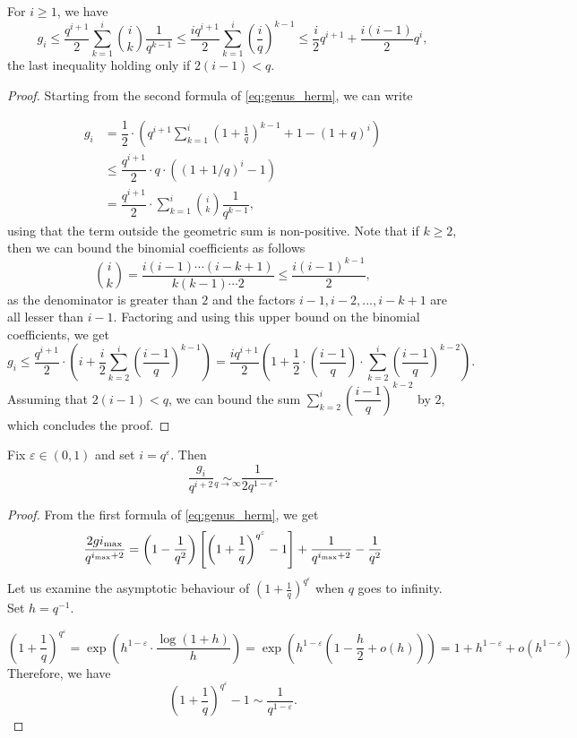 \documentclass[10pt,a4paper]{article}
\renewcommand\epsilon{\varepsilon}
\newcommand{\cd}{\cdot}
\newcommand{\ii}{i_{\rm{max}}}
\theoremstyle{plain}
\theoremstyle{plain}
\theoremstyle{definition}
\theoremstyle{remark}
\theoremstyle{plain}
\begin{document}
\begin{proposition}\label{prop:maj_genus_herm}
	For $i \geq 1$, we have
	\[g_i \leq \dfrac{q^{i+1}}{2} \sum\limits_{k=1}^i \binom{i}{k} \dfrac{1}{q^{k-1}} \leq \dfrac{iq^{i+1}}{2} \sum\limits_{k=1}^i \left(\dfrac{i}{q}\right)^{k-1} \leq \dfrac{i}{2}q^{i+1} + \dfrac{i(i-1)}{2}q^i,\]
	the last inequality holding only if $2(i-1) < q$.
\end{proposition}

\begin{proof}
	Starting from the second formula of \eqref{eq:genus_herm}, we can write
	
	\begin{align*} g_i  &= \dfrac{1}{2} \cd \left(q^{i+1}\sum\limits_{k=1}^i \left(1+\frac{1}{q}\right)^{k-1} +1 -(1+q)^i\right)\\ 
    &\leq \dfrac{q^{i+1}}{2} \cd q \cd ((1+1/q)^i-1) \\ &= \dfrac{q^{i+1}}{2} \cd \sum\limits_{k=1}^i \binom{i}{k} \dfrac{1}{q^{k-1}},
    \end{align*}
	using that the term outside the geometric sum is non-positive. Note that if $k \geq 2$, then we can bound the binomial coefficients as follows
	\[\binom{i}{k} = \dfrac{i(i-1) \cdots (i-k+1)}{k(k-1) \cdots 2} \leq \dfrac{i(i-1)^{k-1}}{2},\] 
	as the denominator is greater than $2$ and the factors $i-1,i-2,...,i-k+1$ are all lesser than $i-1$. Factoring and using this upper bound on the binomial coefficients, we get
	\[  g_i \leq \dfrac{q^{i+1}}{2} \cd \left( i + \frac{i}{2} \sum\limits_{k=2}^i \left(\dfrac{i-1}{q}\right)^{k-1}\right) = \dfrac{iq^{i+1}}{2} \left( 1 + \frac{1}{2} \cd \left(\frac{i-1}{q}\right) \cd \sum\limits_{k=2}^i \left(\dfrac{i-1}{q}\right)^{k-2}\right).\]
	Assuming that $2(i-1) < q$, we can bound the sum  $\sum\limits_{k=2}^i \left(\dfrac{i-1}{q}\right)^{k-2}$ by $2$, which concludes the proof.
\end{proof}

\begin{lemma}\label{lem:gen_sympt}
	Fix $\epsilon \in (0,1)$ and set $i = q^{\epsilon}$. Then
	\[\frac{g_i}{q^{i+2}} \underset{q \rightarrow \infty}{\sim} \frac{1}{2q^{1-\epsilon}}.\]
\end{lemma}

\begin{proof}
	From the first formula of \eqref{eq:genus_herm}, we get
	\[\frac{2g{\ii}}{q^{\ii+2}}=\left(1-\frac{1}{q^2}\right)\left[\left(1+\frac{1}{q}\right)^{q^\epsilon}-1\right]+\frac{1}{q^{\ii+2}}-\frac{1}{q^2}\]
	Let us examine the asymptotic behaviour of $\left(1+\frac{1}{q}\right)^{q^\epsilon}$ when $q$ goes to infinity. Set $h = q^{-1}$.
	
	\[\left(1+\frac{1}{q}\right)^{q^\epsilon}=\exp\left(h^{1-\epsilon}\cdot\frac{\log(1+h)}{h}\right)=\exp\left(h^{1-\epsilon}\left(1-\frac{h}{2}+o(h)\right)\right)=1+h^{1-\epsilon}+o(h^{1-\epsilon})\]
	Therefore, we have
	\[\left(1+\frac{1}{q}\right)^{q^\epsilon}-1 \sim \frac{1}{q^{1-\epsilon}}.\]
\end{proof}
\end{document}
